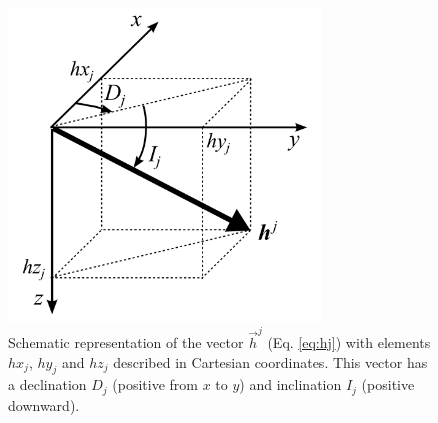 \documentclass[journal abbreviation, npg]{copernicus}
\begin{document}
\begin{figure}[t]
\vspace*{2mm}
\begin{center}
\includegraphics[width=8.3cm]{Figures/Fig2.png}
\end{center}
\caption{Schematic representation of the vector $\vec{h}^{j}$ (Eq. \ref{eq:hj}) with elements $hx_{j}$, $hy_{j}$ and $hz_{j}$ described in Cartesian coordinates. This vector has a declination $D_{j}$ (positive from $x$ to $y$) and inclination $I_{j}$ (positive downward).}
\label{fig:spherical-coordinates}
\end{figure}










\end{document}
